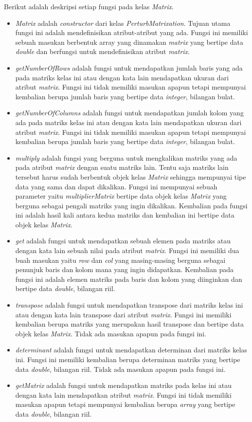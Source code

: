 Berikut adalah deskripsi setiap fungsi pada kelas \textit{Matrix}.
\begin{itemize}
	\item \textit{Matrix} adalah \textit{constructor} dari kelas \textit{PerturbMatrixation}. Tujuan utama fungsi ini adalah mendefinisikan atribut-atribut yang ada. Fungsi ini memiliki sebuah masukan berbentuk array yang dinamakan \textit{matrix} yang bertipe data \textit{double} dan berfungsi untuk mendefinisikan atribut \textit{matrix}.
	\item \textit{getNumberOfRows} adalah fungsi untuk mendapatkan jumlah baris yang ada pada matriks kelas ini atau dengan kata lain mendapatkan ukuran dari atribut \textit{matrix}. Fungsi ini tidak memiliki masukan apapun tetapi mempunyai kembalian berupa jumlah baris yang bertipe data \textit{integer}, bilangan bulat.
	\item \textit{getNumberOfColumns} adalah fungsi untuk mendapatkan jumlah kolom yang ada pada matriks kelas ini atau dengan kata lain mendapatkan ukuran dari atribut \textit{matrix}. Fungsi ini tidak memiliki masukan apapun tetapi mempunyai kembalian berupa jumlah baris yang bertipe data \textit{integer}, bilangan bulat.
	\item \textit{multiply} adalah fungsi yang berguna untuk mengkalikan matriks yang ada pada atribut \textit{matrix} dengan suatu matriks lain. Tentu saja matriks lain tersebut harus sudah berbentuk objek kelas \textit{Matrix} sehingga mempunyai tipe data yang sama dan dapat dikalikan. Fungsi ini mempunyai sebuah parameter yaitu \textit{multiplierMatrix} bertipe data objek kelas \textit{Matrix} yang berguna sebagai pengali matriks yang ingin dikalikan. Kembalian pada fungsi ini adalah hasil kali antara kedua matriks dan kembalian ini bertipe data objek kelas \textit{Matrix}.
	\item \textit{get} adalah fungsi untuk mendapatkan sebuah elemen pada matriks atau dengan kata lain sebuah nilai pada atribut \textit{matrix}. Fungsi ini memiliki dua buah masukan yaitu \textit{row} dan \textit{col} yang masing-masing berguna sebagai penunjuk baris dan kolom mana yang ingin didapatkan. Kembalian pada fungsi ini adalah elemen matriks pada baris dan kolom yang diinginkan dan bertipe data \textit{double}, bilangan riil.
	\item \textit{transpose} adalah fungsi untuk mendapatkan transpose dari matriks kelas ini atau dengan kata lain transpose dari atribut \textit{matrix}. Fungsi ini memiliki kembalian berupa matriks yang merupakan hasil transpose dan bertipe data objek kelas \textit{Matrix}. Tidak ada masukan apapun pada fungsi ini.
	\item \textit{determinant} adalah fungsi untuk mendapatkan determinan dari matriks kelas ini. Fungsi ini memiliki kembalian berupa determinan matriks yang bertipe data \textit{double}, bilangan riil. Tidak ada masukan apapun pada fungsi ini.
	\item \textit{getMatrix} adalah fungsi untuk mendapatkan matriks pada kelas ini atau dengan kata lain mendapatkan atribut \textit{matrix}. Fungsi ini tidak memiliki masukan apapun tetapi mempunyai kembalian berupa \textit{array} yang bertipe data \textit{double}, bilangan riil.
\end{itemize}

